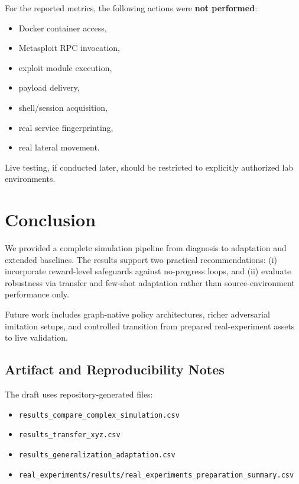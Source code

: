 \documentclass[conference]{IEEEtran}
\begin{document}
For the reported metrics, the following actions were \textbf{not performed}:
\begin{itemize}
    \item Docker container access,
    \item Metasploit RPC invocation,
    \item exploit module execution,
    \item payload delivery,
    \item shell/session acquisition,
    \item real service fingerprinting,
    \item real lateral movement.
\end{itemize}

Live testing, if conducted later, should be restricted to explicitly authorized lab environments.

\section{Conclusion}
We provided a complete simulation pipeline from diagnosis to adaptation and extended baselines. The results support two practical recommendations: (i) incorporate reward-level safeguards against no-progress loops, and (ii) evaluate robustness via transfer and few-shot adaptation rather than source-environment performance only.

Future work includes graph-native policy architectures, richer adversarial imitation setups, and controlled transition from prepared real-experiment assets to live validation.

\subsection*{Artifact and Reproducibility Notes}
The draft uses repository-generated files:
\begin{itemize}
    \item \texttt{results\_compare\_complex\_simulation.csv}
    \item \texttt{results\_transfer\_xyz.csv}
    \item \texttt{results\_generalization\_adaptation.csv}
    \item \texttt{real\_experiments/results/real\_experiments\_preparation\_summary.csv}
\end{itemize}



\end{document}
